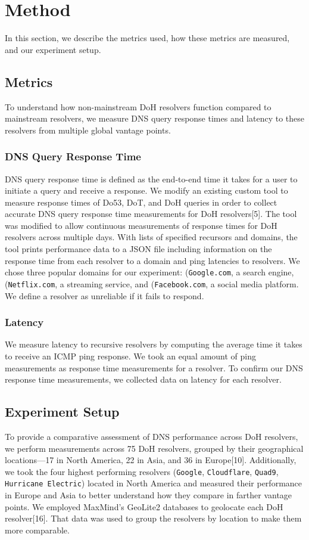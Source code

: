 \section{Method}\label{sec:method}
In this section, we describe the metrics used, how these metrics are measured, and our experiment setup.

\subsection{Metrics}
To understand how non-mainstream DoH resolvers function compared to mainstream resolvers, we measure DNS query response times and latency to these resolvers from multiple global vantage points.

\subsubsection{DNS Query Response Time}
DNS query response time is defined as the end-to-end time it takes for a user to initiate a query and receive a response.
We modify an existing custom tool to measure response times of Do53, DoT, and DoH queries in order to collect accurate DNS query response time measurements for DoH resolvers[5].
The tool was modified to allow continuous measurements of response times for DoH resolvers across multiple days.
With lists of specified recursors and domains, the tool prints performance data to a JSON file including information on the response time from each resolver to a domain and ping latencies to resolvers.
We chose three popular domains for our experiment: (\texttt{Google.com}, a search engine, (\texttt{Netflix.com}, a streaming service, and (\texttt{Facebook.com}, a social media platform. 
We define a resolver as unreliable if it fails to respond.  

\subsubsection{Latency}
We measure latency to recursive resolvers by computing the average time it takes to receive an ICMP ping response.
We took an equal amount of ping measurements as response time measurements for a resolver.
To confirm our DNS response time measurements, we collected data on latency for each resolver. 

\subsection{Experiment Setup}
To provide a comparative assessment of DNS performance across DoH resolvers, we perform measurements across 75 DoH resolvers, grouped by their geographical locations—17 in North America, 22 in Asia, and 36 in Europe[10].
Additionally, we took the four highest performing resolvers (\texttt{Google}, \texttt{Cloudflare}, \texttt{Quad9}, \texttt{Hurricane Electric}) located in North America and measured their performance in Europe and Asia to better understand how they compare in farther vantage points.  
We employed MaxMind's GeoLite2 databases to geolocate each DoH resolver[16].
That data was used to group the resolvers by location to make them more comparable. 

